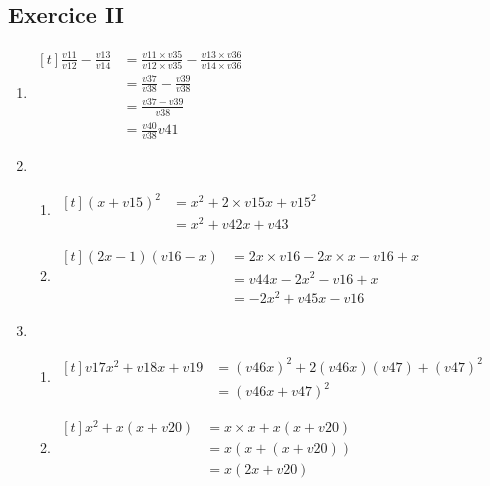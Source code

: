 \documentclass{article}%
\begin{document}
\subsection*{Exercice II}
\begin{enumerate}
\item $\begin{aligned}[t]
\frac{{v11}}{{v12}}-\frac{{v13}}{{v14}} &= \frac{{v11}\times {v35}}{{v12}\times {v35}} - \frac{{v13}\times {v36}}{{v14}\times {v36}} \\
&= \frac{{v37}}{{v38}} - \frac{{v39}}{{v38}} \\
&= \frac{{v37}-{v39}}{{v38}} \\
&= \frac{{v40}}{{v38}}{v41}
\end{aligned}$

\item
\begin{enumerate}
\item $\begin{aligned}[t]
(x+{v15})^2 &= x^2 + 2\times {v15}x + {v15}^2\\
&= x^2 + {v42}x + {v43}
\end{aligned}$


\item $\begin{aligned}[t]
(2x-1)({v16}-x) &= 2x\times {v16} - 2x\times x - {v16} + x\\
&= {v44}x - 2x^2 - {v16} + x\\
&=-2x^2 + {v45}x -{v16}
\end{aligned}$
\end{enumerate}

\item
\begin{enumerate}
\item $\begin{aligned}[t]
{v17}x^2+{v18}x+{v19} &= ({v46}x)^2+2({v46}x)({v47})+({v47})^2\\
&= ({v46}x+{v47})^2
\end{aligned}$

\item $\begin{aligned}[t]
x^2+x(x+{v20}) &= x\times x+x(x+{v20})\\
&= x(x+(x+{v20}))\\
&= x(2x+{v20})
\end{aligned}$

\end{enumerate}
\end{enumerate}
\end{document}
